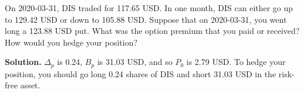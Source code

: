 \noindent On 2020-03-31, DIS traded for 117.65 USD. In one month, DIS can either go up to 129.42 USD or down to 105.88 USD. Suppose that on 2020-03-31, you went long a 123.88 USD put. What was the option premium that you paid or received? How would you hedge your position?

\vspace{9pt}

\noindent\textbf{Solution.} $\Delta_{p}$ is 0.24, $B_{p}$ is 31.03 USD, and so $P_{0}$ is 2.79 USD. To hedge your position, you should go long 0.24 shares of DIS and short 31.03 USD in the risk-free asset.